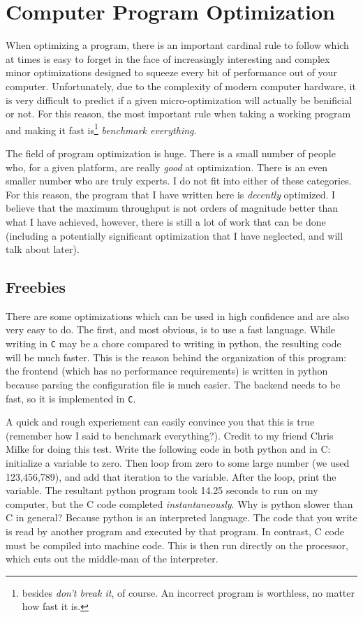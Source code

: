 \section{Computer Program Optimization} \label{app:opt}

When optimizing a program, there is an important cardinal rule to follow which at times
is easy to forget in the face of increasingly interesting and complex minor optimizations
designed to squeeze every bit of performance out of your computer. Unfortunately, due
to the complexity of modern computer hardware, it is
very difficult to predict if a given micro-optimization will actually be benificial or
not. For this reason, the most important rule when taking a working program and making it
fast is\footnote{besides \textit{don't break it}, of course. An incorrect program is worthless, no matter
how fast it is.} \textit{benchmark everything}.

The field of program optimization is huge. There is a small number of people who, for
a given platform, are really \textit{good} at optimization. There is an even smaller number
who are truly experts. I do not fit into either of these categories. For this reason, the program
that I have written here is \textit{decently} optimized. I believe that the maximum throughput
is not orders of magnitude better than what I have achieved, however, there is still a lot of work
that can be done (including a potentially significant optimization that I have neglected, and will talk
about later).


\subsection{Freebies}

There are some optimizations which can be used in high confidence and are also very easy to do.
The first, and most obvious, is to use a fast language. While writing in \texttt{C} may be a chore
compared to writing in python, the resulting code will be much faster. This is the reason behind the
organization of this program: the frontend (which has no performance requirements) is written in
python because parsing the configuration file is much easier. The backend needs to be fast, so it
is implemented in \texttt{C}.

A quick and rough experiement can easily convince you that this is true (remember how I said to
benchmark everything?). Credit to my friend Chris Milke for doing this test. Write the following
code in both python and in C: initialize a variable to zero. Then loop from zero to some large
number (we used 123,456,789), and add that iteration to the variable. After the loop, print the
variable. The resultant python program took 14.25 seconds to run on my computer, but the C code
completed \textit{instantaneously}. Why is python slower than C in general? Because python is
an interpreted language. The code that you write is read by another program and executed by
that program. In contrast, C code must be compiled into machine code. This is then run directly
on the processor, which cuts out the middle-man of the interpreter.

